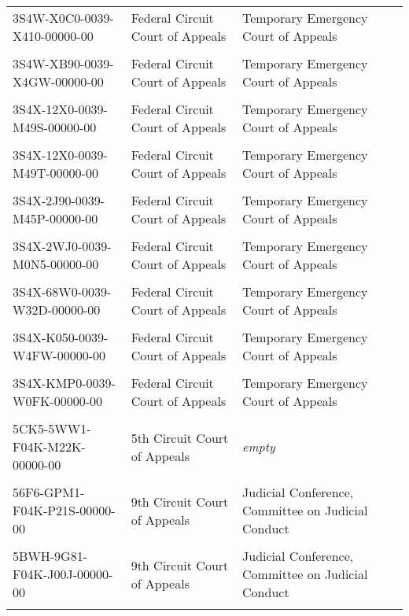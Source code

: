 \documentclass[10pt, letterpaper]{article}
\begin{document}
\begin{spacing}{1.0}
\begin{table}[H]
\begin{tabular}{llp{2.25in}}
        3S4W-X0C0-0039-X410-00000-00 & Federal Circuit Court of Appeals & Temporary Emergency Court of Appeals\\\\[-4pt]
        3S4W-XB90-0039-X4GW-00000-00 & Federal Circuit Court of Appeals & Temporary Emergency Court of Appeals\\\\[-4pt]
        3S4X-12X0-0039-M49S-00000-00 & Federal Circuit Court of Appeals & Temporary Emergency Court of Appeals\\\\[-4pt]
        3S4X-12X0-0039-M49T-00000-00 & Federal Circuit Court of Appeals & Temporary Emergency Court of Appeals\\\\[-4pt]
        3S4X-2J90-0039-M45P-00000-00 & Federal Circuit Court of Appeals & Temporary Emergency Court of Appeals\\\\[-4pt]
        3S4X-2WJ0-0039-M0N5-00000-00 & Federal Circuit Court of Appeals & Temporary Emergency Court of Appeals\\\\[-4pt]
        3S4X-68W0-0039-W32D-00000-00 & Federal Circuit Court of Appeals & Temporary Emergency Court of Appeals\\\\[-4pt]
        3S4X-K050-0039-W4FW-00000-00 & Federal Circuit Court of Appeals & Temporary Emergency Court of Appeals\\\\[-4pt]
        3S4X-KMP0-0039-W0FK-00000-00 & Federal Circuit Court of Appeals & Temporary Emergency Court of Appeals\\\\[-4pt]
        5CK5-5WW1-F04K-M22K-00000-00 & 5th Circuit Court of Appeals & \textit{empty}\\\\[-4pt]
        56F6-GPM1-F04K-P21S-00000-00 & 9th Circuit Court of Appeals & Judicial Conference, Committee on Judicial Conduct\\\\[-4pt]
        5BWH-9G81-F04K-J00J-00000-00 & 9th Circuit Court of Appeals & Judicial Conference, Committee on Judicial Conduct\\[4pt]
        \hline\\
    \end{tabular}
    \label{tab:caseDiffCourt}
\end{table}


\end{spacing}
\end{document}
